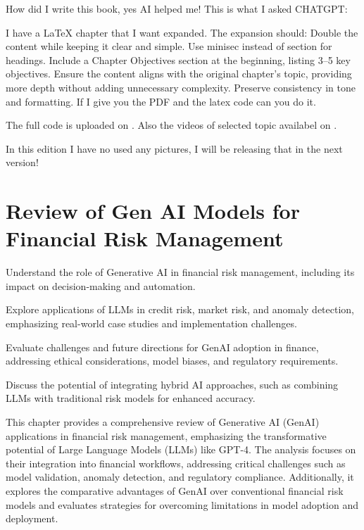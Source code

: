 \documentclass[a4paper,12pt]{scrbook}
\begin{document}
	How did I write this book, yes AI helped me!
	This is what I asked CHATGPT:
	
	I have a LaTeX chapter that I want expanded. The expansion should:
	Double the content while keeping it clear and simple.
	Use minisec instead of section for headings.
	Include a Chapter Objectives section at the beginning, listing 3–5 key objectives.
	Ensure the content aligns with the original chapter's topic, providing more depth without adding unnecessary complexity.
	Preserve consistency in tone and formatting.
	If I give you the PDF and the latex code can you do it.
	
	
	The full code is uploaded on \cite{JoshiGit2025}.
	Also the videos of selected topic availabel on \cite{JoshiYouTube2025}.
	
		In this edition I have no used any pictures, I will be releasing that in the  next version!  
	
	
	
	
	\chapter{Review of Gen AI Models for Financial Risk Management}
	
	\begin{arrows}
		\item Understand the role of Generative AI in financial risk management, including its impact on decision-making and automation.
		\item Explore applications of LLMs in credit risk, market risk, and anomaly detection, emphasizing real-world case studies and implementation challenges.
		\item Evaluate challenges and future directions for GenAI adoption in finance, addressing ethical considerations, model biases, and regulatory requirements.
		\item Discuss the potential of integrating hybrid AI approaches, such as combining LLMs with traditional risk models for enhanced accuracy.
	\end{arrows}
	
	This chapter provides a comprehensive review of Generative AI (GenAI) applications in financial risk management, emphasizing the transformative potential of Large Language Models (LLMs) like GPT-4. The analysis focuses on their integration into financial workflows, addressing critical challenges such as model validation, anomaly detection, and regulatory compliance. Additionally, it explores the comparative advantages of GenAI over conventional financial risk models and evaluates strategies for overcoming limitations in model adoption and deployment.
	
\end{document}
